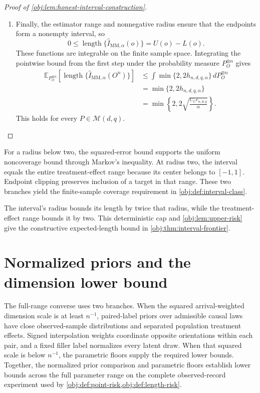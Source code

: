 \documentclass[11pt]{article}
\begin{document}
\begin{proof}[Proof of \cref{obj:lem:honest-interval-construction}]
\begin{enumerate}
\item Finally, the estimator range and nonnegative radius ensure that the endpoints form a nonempty interval, so
\[
0\le\operatorname{length}\{\widehat I_{\mathrm{MM},\alpha}(o)\}
=U(o)-L(o).
\]
These functions are integrable on the finite sample space. Integrating the pointwise bound from the first step under the probability measure \(P_O^{\otimes n}\) gives
\[
\begin{aligned}
\mathbb E_{P_O^{\otimes n}}
\!\left[\operatorname{length}\{\widehat I_{\mathrm{MM},\alpha}(O^n)\}\right]
&\le
\int\min\{2,2h_{n,d,q,\alpha}\}\,dP_O^{\otimes n}\\
&=\min\{2,2h_{n,d,q,\alpha}\}\\
&=\min\left\{2,2\sqrt{\frac{C_Ur_{n,d,q}}{\alpha}}\right\}.
\end{aligned}
\]
This holds for every \(P\in\mathcal M(d,q)\).
\end{enumerate}
\end{proof}

For a radius below two, the squared-error bound supports the uniform noncoverage bound through Markov's inequality. At radius two, the interval equals the entire treatment-effect range because its center belongs to \([-1,1]\). Endpoint clipping preserves inclusion of a target in that range. These two branches yield the finite-sample coverage requirement in \cref{obj:def:interval-class}.

The interval's radius bounds its length by twice that radius, while the treatment-effect range bounds it by two. This deterministic cap and \cref{obj:lem:upper-risk} give the constructive expected-length bound in \cref{obj:thm:interval-frontier}.


\section{Normalized priors and the dimension lower bound}

The full-range converse uses two branches. When the squared arrival-weighted dimension scale is at least \(n^{-1}\), paired-label priors over admissible causal laws have close observed-sample distributions and separated population treatment effects. Signed interpolation weights coordinate opposite orientations within each pair, and a fixed filler label normalizes every latent draw. When that squared scale is below \(n^{-1}\), the parametric floors supply the required lower bounds. Together, the normalized prior comparison and parametric floors establish lower bounds across the full parameter range on the complete observed-record experiment used by \cref{obj:def:point-risk,obj:def:length-risk}.
\end{document}
